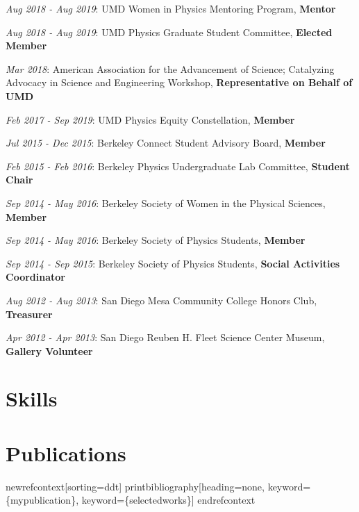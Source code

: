 \documentclass[
  10pt,
  letterpaper,
  DIV=11,
  numbers=noendperiod]{scrartcl}
\begin{document}
\textcolor{mygray}{\textit{Aug 2018 - Aug 2019}}: UMD Women in Physics
Mentoring Program, \textbf{Mentor}

\textcolor{mygray}{\textit{Aug 2018 - Aug 2019}}: UMD Physics Graduate
Student Committee, \textbf{Elected Member}

\textcolor{mygray}{\textit{Mar 2018}}: American Association for the
Advancement of Science; Catalyzing Advocacy in Science and Engineering
Workshop, \textbf{Representative on Behalf of UMD}

\textcolor{mygray}{\textit{Feb 2017 - Sep 2019}}: UMD Physics Equity
Constellation, \textbf{Member}

\textcolor{mygray}{\textit{Jul 2015 - Dec 2015}}: Berkeley Connect
Student Advisory Board, \textbf{Member}

\textcolor{mygray}{\textit{Feb 2015 - Feb 2016}}: Berkeley Physics
Undergraduate Lab Committee, \textbf{Student Chair}

\textcolor{mygray}{\textit{Sep 2014 - May 2016}}: Berkeley Society of
Women in the Physical Sciences, \textbf{Member}

\textcolor{mygray}{\textit{Sep 2014 - May 2016}}: Berkeley Society of
Physics Students, \textbf{Member}

\textcolor{mygray}{\textit{Sep 2014 - Sep 2015}}: Berkeley Society of
Physics Students, \textbf{Social Activities Coordinator}

\textcolor{mygray}{\textit{Aug 2012 - Aug 2013}}: San Diego Mesa
Community College Honors Club, \textbf{Treasurer}

\textcolor{mygray}{\textit{Apr 2012 - Apr 2013}}: San Diego Reuben H.
Fleet Science Center Museum, \textbf{Gallery Volunteer}

\hypertarget{fa-tools-skills}{%
\section{\texorpdfstring{
Skills}{ Skills}}\label{fa-tools-skills}}

\hypertarget{fa-pen-nib-publications}{%
\section{\texorpdfstring{
Publications}{ Publications}}\label{fa-pen-nib-publications}}

newrefcontext{[}sorting=ddt{]} printbibliography{[}heading=none,
keyword=\{mypublication\}, keyword=\{selectedworks\}{]} endrefcontext
\end{document}

